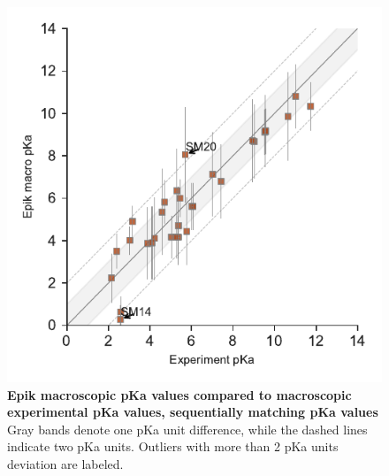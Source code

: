 \documentclass[9pt,lineno,final]{elife}
\begin{document}
\begin{figure}[hbtp]
	\centering
	\includegraphics[]{Reports/Experiment-Epik-macro-align-correlation.pdf}	
	\caption{{\bf Epik macroscopic pKa values compared to macroscopic experimental pKa values, sequentially matching pKa values}  Gray bands denote one pKa unit difference, while the dashed lines indicate two pKa units. Outliers with more than 2 pKa units deviation are labeled.}
\end{figure}
\end{document}
